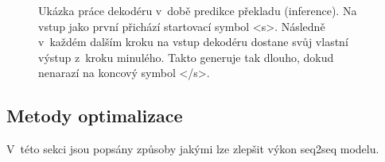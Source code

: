 \begin{figure}[H]
    \begin{center}
    \end{center}
	\caption{Ukázka práce dekodéru v~době predikce překladu (inference). Na vstup jako první přichází startovací symbol <s>. Následně v~každém dalším kroku na vstup dekodéru dostane svůj vlastní výstup z~kroku minulého. Takto generuje tak dlouho, dokud nenarazí na koncový symbol </s>.}
	\label{img:inference}
\end{figure}

\subsection{Metody optimalizace} \label{subsection:optimization} V~této sekci jsou popsány způsoby jakými lze zlepšit výkon seq2seq modelu.

